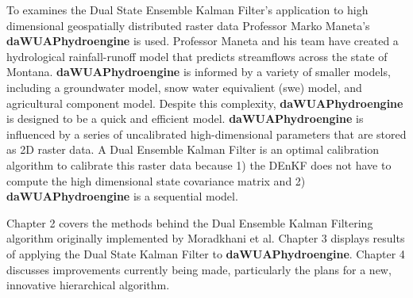 	 To examines the Dual State Ensemble Kalman Filter's application to high dimensional geospatially distributed raster data Professor Marko Maneta's \textbf{daWUAPhydroengine} is used. Professor Maneta and his team have created a hydrological rainfall-runoff model that predicts streamflows across the state of Montana. \textbf{daWUAPhydroengine} is informed by a variety of smaller models, including a groundwater model, snow water equivalient (swe) model, and agricultural component model. Despite this complexity, \textbf{daWUAPhydroengine} is designed to be a quick and efficient model. \textbf{daWUAPhydroengine} is influenced by a series of uncalibrated high-dimensional parameters that are stored as 2D raster data. A Dual Ensemble Kalman Filter is an optimal calibration algorithm to calibrate this raster data because 1) the DEnKF does not have to compute the high dimensional state covariance matrix and 2) \textbf{daWUAPhydroengine} is a sequential model.
	
	Chapter 2 covers the methods behind the Dual Ensemble Kalman Filtering algorithm originally implemented by Moradkhani et al. Chapter 3 displays results of applying the Dual State Kalman Filter to \textbf{daWUAPhydroengine}. Chapter 4 discusses improvements currently being made, particularly the plans for a new, innovative hierarchical algorithm.
	
	
	

	